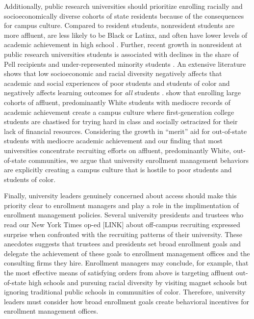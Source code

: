 \documentclass[twoside]{article}
\begin{document}
Additionally, public research universities should prioritize enrolling racially and socioeconomically diverse cohorts of state residents because of the consequences for campus culture. Compared to resident students, nonresident students are more affluent, are less likely to be Black or Latinx, and often have lower levels of academic achievement in high school \citep{RN3685}.  Further, recent growth in nonresident at public research universities students is associated with declines in the share of Pell recipients and under-represented minority students \citep{RN3685}.  An extensive literature shows that low socioeconomic and racial diversity negatively affects that academic and social experiences of poor students and students of color \citep[e.g., ][]{RN3205,RN3193,RN3639,RN3185} and negatively affects learning outcomes for \textit{all} students \citep[e.g., ][]{RN3026,RN2576,RN3153,RN3174}. \cite{RN4231} show that enrolling large cohorts of affluent, predominantly White students with mediocre records of academic achievement create a campus culture where first-generation college students are chastised for trying hard in class and socially ostracized for their lack of financial resources.  Considering the growth in ``merit'' aid for out-of-state students with mediocre academic achievement \citep[e.g., ][]{RN4032,RN4409,RN3762} and our finding that most universities concentrate recruiting efforts on affluent, predominantly White, out-of-state communities, we argue that university enrollment management behaviors are explicitly creating a campus culture that is hostile to poor students and students of color.

Finally, university leaders genuinely concerned about access should make this priority clear to enrollment managers and play a role in the implimentation of enrollment management policies.  Several university presidents and trustees who read our New York Times op-ed [LINK] about off-campus recruiting expressed surprise when confronted with the recruiting patterns of their university.  These anecdotes suggests that trustees and presidents set broad enrollment goals and delegate the achievement of these goals to enrollment management offices and the consulting firms they hire. Enrollment managers may conclude, for example, that the most effective means of satisfying orders from above is targeting affluent out-of-state high schools and pursuing racial diversity by visiting magnet schools but ignoring traditional public schools in communities of color.  Therefore, university leaders must consider how broad enrollment goals create behavioral incentives for enrollment management offices.
\end{document}
